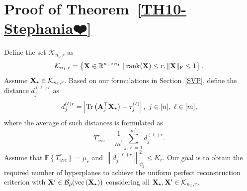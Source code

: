 \documentclass[12pt,draftcls,onecolumn]{IEEEtran}
\begin{document}
\section{Proof of Theorem~\ref{TH10-Stephania❤️}}
\label{soli}
Define the set $\mathcal{K}_{n_1,r}$ as
\begin{equation}
\label{kvm_45}
\mathcal{K}_{n_1,r}=\left\{\mbX\in\mathbb{R}^{n_1\times n_1}\mid \operatorname{rank}(\mbX)\leq r,\|\mbX\|_{\mathrm{F}}\leq 1\right\}.
\end{equation}
Assume $\mathbf{X}_{\star}\in\mathcal{K}_{n_1,r}$. Based on our formulations in Section~\ref{SVP}, define the distance $d_j^{(\ell)r}$ as
\begin{equation}
\label{kvm_46}
d_j^{(\ell)r}=\left|\operatorname{Tr}\left(\mbA_j^{\top}\mbX_{\star}\right)-\tau_j^{(\ell)}\right|,~j\in[n],~\ell\in[m],
\end{equation}
where the average of such distances is formulated as
\begin{equation}
\label{kvm_47}
T_{\mathrm{ave}}^r=\frac{1}{m^{\prime}}\sum_{j,\ell=1}^{m^{\prime}}d_j^{(\ell)r}.
\end{equation}
Assume that $\mathbb{E}\left\{T_{\mathrm{ave}}^{r}\right\}=\mu_r$ and $\left\|d_j^{(\ell)r}\right\|_{\psi_2}^2\leq K_r$. 
Our goal is to obtain the required number of hyperplanes to achieve the uniform perfect reconstruction criterion with $\mathbf{X}^{\prime}\in\mathcal{B}_{\rho}(\operatorname{vec}\left(\mathbf{X}_{\star}\right))$ considering all $\mathbf{X}_{\star},\mathbf{X}^{\prime}\in\mathcal{K}_{n_1,r}$.

\end{document}
